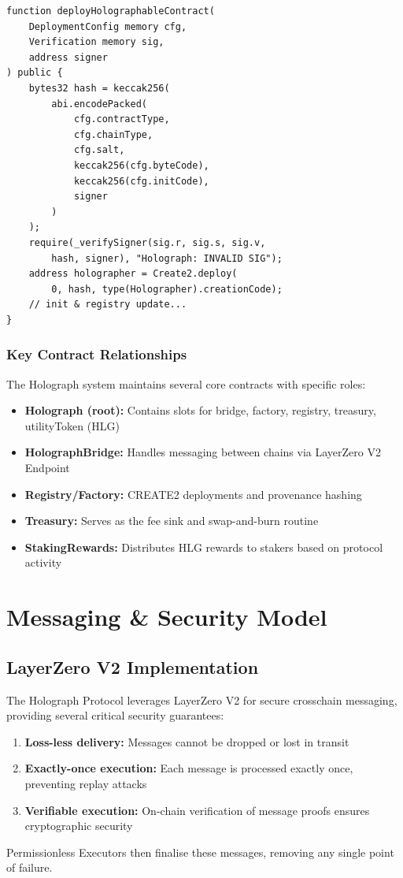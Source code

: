 \documentclass[10pt,a4paper,twocolumn]{article}
\begin{document}
\begin{lstlisting}[language=Solidity, caption=HolographFactory deployment code]
function deployHolographableContract(
    DeploymentConfig memory cfg,
    Verification memory sig,
    address signer
) public {
    bytes32 hash = keccak256(
        abi.encodePacked(
            cfg.contractType,
            cfg.chainType,
            cfg.salt,
            keccak256(cfg.byteCode),
            keccak256(cfg.initCode),
            signer
        )
    );
    require(_verifySigner(sig.r, sig.s, sig.v,
        hash, signer), "Holograph: INVALID SIG");
    address holographer = Create2.deploy(
        0, hash, type(Holographer).creationCode);
    // init & registry update...
}
\end{lstlisting}

\subsubsection{Key Contract Relationships}
The Holograph system maintains several core contracts with specific roles:
\begin{itemize}
  \item \textbf{Holograph (root):} Contains slots for bridge, factory, registry, treasury, utilityToken (HLG)
  \item \textbf{HolographBridge:} Handles messaging between chains via LayerZero V2 Endpoint
  \item \textbf{Registry/Factory:} CREATE2 deployments and provenance hashing
  \item \textbf{Treasury:} Serves as the fee sink and swap-and-burn routine
  \item \textbf{StakingRewards:} Distributes HLG rewards to stakers based on protocol activity
\end{itemize}

\section{Messaging \& Security Model}

\subsection{LayerZero V2 Implementation}
The Holograph Protocol leverages LayerZero V2 for secure crosschain messaging, providing several critical security guarantees:
\begin{enumerate}
  \item \textbf{Loss-less delivery:} Messages cannot be dropped or lost in transit
  \item \textbf{Exactly-once execution:} Each message is processed exactly once, preventing replay attacks
  \item \textbf{Verifiable execution:} On-chain verification of message proofs ensures cryptographic security
\end{enumerate}
Permissionless Executors then finalise these messages, removing any single point of failure.
\end{document}
